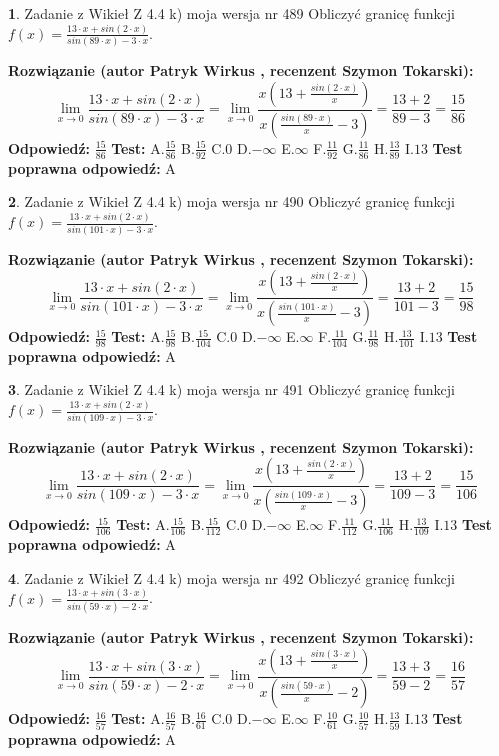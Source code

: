 \documentclass[12pt, a4paper]{article}
\theoremstyle{definition} %
\newtheorem{zad}{}
\newcommand{\zadStart}[1]{\begin{zad}#1\newline}
\newcommand{\zadStop}{\end{zad}}
\newcommand{\rozwStart}[2]{\noindent \textbf{Rozwiązanie (autor #1 , recenzent #2): }\newline}
\newcommand{\rozwStop}{\newline}
\newcommand{\odpStart}{\noindent \textbf{Odpowiedź:}\newline}
\newcommand{\odpStop}{\newline}
\newcommand{\testStart}{\noindent \textbf{Test:}\newline}
\newcommand{\testStop}{\newline}
\newcommand{\kluczStart}{\noindent \textbf{Test poprawna odpowiedź:}\newline}
\newcommand{\kluczStop}{\newline}
\begin{document}
\zadStart{Zadanie z Wikieł Z 4.4 k) moja wersja nr 489}
Obliczyć granicę funkcji $f(x)=\frac{13\cdot x +sin(2\cdot x)}{sin(89\cdot x) -3\cdot x}$.
\zadStop
\rozwStart{Patryk Wirkus}{Szymon Tokarski}
$$\lim\limits_{x\to 0}\frac{13\cdot x +sin(2\cdot x)}{sin(89\cdot x) -3\cdot x}
=\lim\limits_{x\to 0}\frac{x(13+\frac{sin(2\cdot x)}{x})}{x(\frac{sin(89\cdot x)}{x}-3)}
=\frac{13+2}{89-3} = \frac{15}{86}$$
\rozwStop
\odpStart
$\frac{15}{86}$
\odpStop
\testStart
A.$\frac{15}{86}$
B.$\frac{15}{92}$
C.$0$
D.$-\infty$
E.$\infty$
F.$\frac{11}{92}$
G.$\frac{11}{86}$
H.$\frac{13}{89}$
I.$13$
\testStop
\kluczStart
A
\kluczStop



\zadStart{Zadanie z Wikieł Z 4.4 k) moja wersja nr 490}
Obliczyć granicę funkcji $f(x)=\frac{13\cdot x +sin(2\cdot x)}{sin(101\cdot x) -3\cdot x}$.
\zadStop
\rozwStart{Patryk Wirkus}{Szymon Tokarski}
$$\lim\limits_{x\to 0}\frac{13\cdot x +sin(2\cdot x)}{sin(101\cdot x) -3\cdot x}
=\lim\limits_{x\to 0}\frac{x(13+\frac{sin(2\cdot x)}{x})}{x(\frac{sin(101\cdot x)}{x}-3)}
=\frac{13+2}{101-3} = \frac{15}{98}$$
\rozwStop
\odpStart
$\frac{15}{98}$
\odpStop
\testStart
A.$\frac{15}{98}$
B.$\frac{15}{104}$
C.$0$
D.$-\infty$
E.$\infty$
F.$\frac{11}{104}$
G.$\frac{11}{98}$
H.$\frac{13}{101}$
I.$13$
\testStop
\kluczStart
A
\kluczStop



\zadStart{Zadanie z Wikieł Z 4.4 k) moja wersja nr 491}
Obliczyć granicę funkcji $f(x)=\frac{13\cdot x +sin(2\cdot x)}{sin(109\cdot x) -3\cdot x}$.
\zadStop
\rozwStart{Patryk Wirkus}{Szymon Tokarski}
$$\lim\limits_{x\to 0}\frac{13\cdot x +sin(2\cdot x)}{sin(109\cdot x) -3\cdot x}
=\lim\limits_{x\to 0}\frac{x(13+\frac{sin(2\cdot x)}{x})}{x(\frac{sin(109\cdot x)}{x}-3)}
=\frac{13+2}{109-3} = \frac{15}{106}$$
\rozwStop
\odpStart
$\frac{15}{106}$
\odpStop
\testStart
A.$\frac{15}{106}$
B.$\frac{15}{112}$
C.$0$
D.$-\infty$
E.$\infty$
F.$\frac{11}{112}$
G.$\frac{11}{106}$
H.$\frac{13}{109}$
I.$13$
\testStop
\kluczStart
A
\kluczStop



\zadStart{Zadanie z Wikieł Z 4.4 k) moja wersja nr 492}
Obliczyć granicę funkcji $f(x)=\frac{13\cdot x +sin(3\cdot x)}{sin(59\cdot x) -2\cdot x}$.
\zadStop
\rozwStart{Patryk Wirkus}{Szymon Tokarski}
$$\lim\limits_{x\to 0}\frac{13\cdot x +sin(3\cdot x)}{sin(59\cdot x) -2\cdot x}
=\lim\limits_{x\to 0}\frac{x(13+\frac{sin(3\cdot x)}{x})}{x(\frac{sin(59\cdot x)}{x}-2)}
=\frac{13+3}{59-2} = \frac{16}{57}$$
\rozwStop
\odpStart
$\frac{16}{57}$
\odpStop
\testStart
A.$\frac{16}{57}$
B.$\frac{16}{61}$
C.$0$
D.$-\infty$
E.$\infty$
F.$\frac{10}{61}$
G.$\frac{10}{57}$
H.$\frac{13}{59}$
I.$13$
\testStop
\kluczStart
A
\kluczStop
\end{document}
